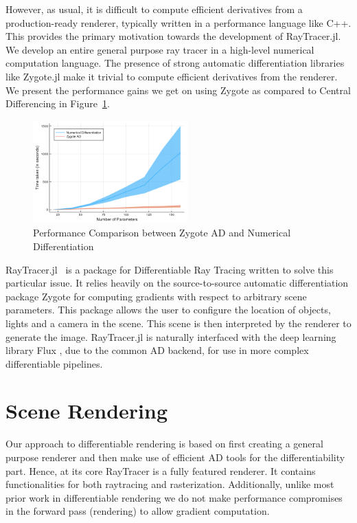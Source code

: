 \documentclass{juliacon}
\begin{document}
However, as usual, it is difficult to compute efficient derivatives from a production-ready renderer, typically written in a performance language like C++. This provides the primary motivation towards the development of RayTracer.jl. We develop an entire general purpose ray tracer in a high-level numerical computation language. The presence of strong automatic differentiation libraries like Zygote.jl make it trivial to compute efficient derivatives from the renderer. We present the performance gains we get on using Zygote as compared to Central Differencing in Figure~\ref{fig:ad_perf}.

\begin{figure}[!htb]
    \centering
    \includegraphics[width=\linewidth, height=150px]{images/differentiation.png}
    \caption{Performance Comparison between Zygote AD and Numerical Differentiation}
    \label{fig:ad_perf}
\end{figure}

RayTracer.jl~\cite{RayTracer.jl} is a package for Differentiable Ray Tracing written to solve this particular issue. It relies heavily on the source-to-source automatic differentiation package Zygote for computing gradients with respect to arbitrary scene parameters. This package allows the user to configure the location of objects, lights and a camera in the scene. This scene is then interpreted by the renderer to generate the image. RayTracer.jl is naturally interfaced with the deep learning library Flux \cite{Flux.jl-2018}, due to the common AD backend, for use in more complex differentiable pipelines.

\section{Scene Rendering}

Our approach to differentiable rendering is based on first creating a general purpose renderer and then make use of efficient AD tools for the differentiability part. Hence, at its core RayTracer is a fully featured renderer. It contains functionalities for both raytracing and rasterization. Additionally, unlike most prior work in differentiable rendering we do not make performance compromises in the forward pass (rendering) to allow gradient computation.
\end{document}
